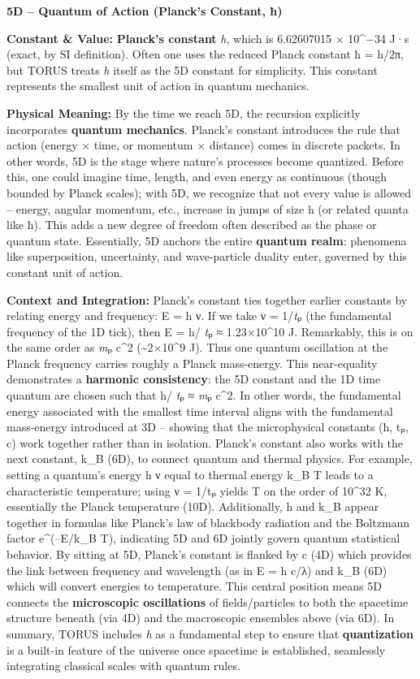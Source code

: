 \textbf{5D -- Quantum of Action (Planck's Constant, ħ)}

\textbf{Constant \& Value:} \textbf{Planck's constant} \emph{h}, which
is 6.62607015 × 10\^{}−34 J·s (exact, by SI definition)​. Often one uses
the reduced Planck constant ħ = h/2π, but TORUS treats \emph{h} itself
as the 5D constant for simplicity. This constant represents the smallest
unit of action in quantum mechanics.

\textbf{Physical Meaning:} By the time we reach 5D, the recursion
explicitly incorporates \textbf{quantum mechanics}. Planck's constant
introduces the rule that action (energy × time, or momentum × distance)
comes in discrete packets. In other words, 5D is the stage where
nature's processes become quantized​. Before this, one could imagine
time, length, and even energy as continuous (though bounded by Planck
scales); with 5D, we recognize that not every value is allowed --
energy, angular momentum, etc., increase in jumps of size h (or related
quanta like ħ). This adds a new degree of freedom often described as the
phase or quantum state. Essentially, 5D anchors the entire
\textbf{quantum realm}: phenomena like superposition, uncertainty, and
wave-particle duality enter, governed by this constant unit of action.

\textbf{Context and Integration:} Planck's constant ties together
earlier constants by relating energy and frequency: E = h ν. If we take
ν = 1/\emph{t}ₚ (the fundamental frequency of the 1D tick), then E = h/
\emph{t}ₚ ≈ 1.23×10\^{}10 J​. Remarkably, this is on the same order as
\emph{m}ₚ c\^{}2 (\textasciitilde{}2×10\^{}9 J)​. Thus one quantum
oscillation at the Planck frequency carries roughly a Planck
mass-energy. This near-equality demonstrates a \textbf{harmonic
consistency}: the 5D constant and the 1D time quantum are chosen such
that h/ \emph{t}ₚ ≈ \emph{m}ₚ c\^{}2​. In other words, the fundamental
energy associated with the smallest time interval aligns with the
fundamental mass-energy introduced at 3D -- showing that the
microphysical constants (ħ, tₚ, c) work together rather than in
isolation. Planck's constant also works with the next constant, k\_B
(6D), to connect quantum and thermal physics. For example, setting a
quantum's energy h ν equal to thermal energy k\_B T leads to a
characteristic temperature; using ν = 1/tₚ yields T on the order of
10\^{}32 K, essentially the Planck temperature (10D)​. Additionally, h
and k\_B appear together in formulas like Planck's law of blackbody
radiation and the Boltzmann factor e\^{}(--E/k\_B T), indicating 5D and
6D jointly govern quantum statistical behavior. By sitting at 5D,
Planck's constant is flanked by c (4D) which provides the link between
frequency and wavelength (as in E = h c/λ) and k\_B (6D) which will
convert energies to temperature​. This central position means 5D
connects the \textbf{microscopic oscillations} of fields/particles to
both the spacetime structure beneath (via 4D) and the macroscopic
ensembles above (via 6D). In summary, TORUS includes \emph{h} as a
fundamental step to ensure that \textbf{quantization} is a built-in
feature of the universe once spacetime is established, seamlessly
integrating classical scales with quantum rules.

